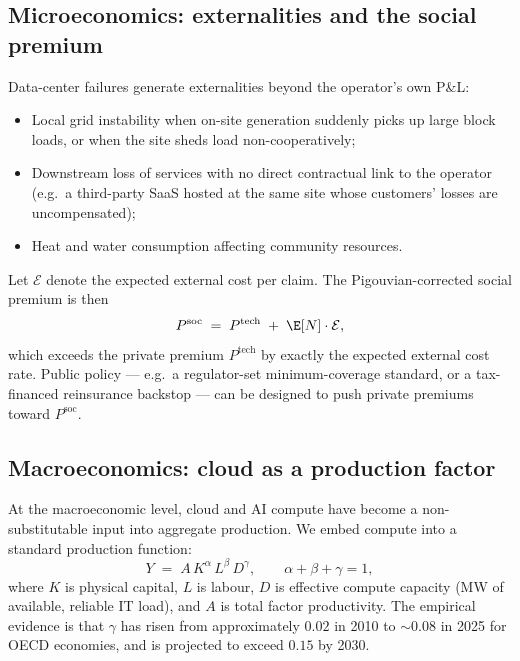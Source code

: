\subsection{Microeconomics: externalities and the social premium}\label{ss:ext}

Data-center failures generate externalities beyond the operator's own
P\&L:
\begin{itemize}[leftmargin=*,nosep]
   \item Local grid instability when on-site generation suddenly picks
         up large block loads, or when the site sheds load
         non-cooperatively;
   \item Downstream loss of services with no direct contractual link
         to the operator (e.g.\ a third-party SaaS hosted at the same
         site whose customers' losses are uncompensated);
   \item Heat and water consumption affecting community resources.
\end{itemize}
Let $\mathcal{E}$ denote the expected external cost per claim. The
Pigouvian-corrected social premium is then
\begin{equation}\label{eq:pigou}
   P^{\mathrm{soc}} \;=\; P^{\mathrm{tech}} \;+\; \E[N]\cdot \mathcal{E},
\end{equation}
which exceeds the private premium $P^{\mathrm{tech}}$ by exactly the
expected external cost rate. Public policy --- e.g.\ a regulator-set
minimum-coverage standard, or a tax-financed reinsurance backstop ---
can be designed to push private premiums toward $P^{\mathrm{soc}}$.

\subsection{Macroeconomics: cloud as a production factor}\label{ss:macro-prod}

At the macroeconomic level, cloud and AI compute have become a
non-substitutable input into aggregate production. We embed compute
into a standard production function:
\begin{equation}\label{eq:prod}
   Y \;=\; A\, K^{\alpha}\, L^{\beta}\, D^{\gamma},
   \qquad \alpha+\beta+\gamma=1,
\end{equation}
where $K$ is physical capital, $L$ is labour, $D$ is effective compute
capacity (\si{\mega\watt} of available, reliable IT load), and $A$
is total factor productivity. The empirical evidence is that
$\gamma$ has risen from approximately $0.02$ in 2010 to $\sim 0.08$ in
2025 for OECD economies, and is projected to exceed $0.15$ by 2030.

